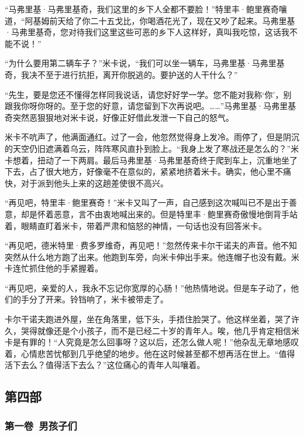 \par “马弗里基·马弗里基奇，我们这里的乡下人全都不要脸！”特里丰·鲍里赛奇嚷道，“阿基姆前天给了你二十五戈比，你喝酒花光了，现在又吵了起来。马弗里基·马弗里基奇，您对待我们这里这些可恶的乡下人这样好，真叫我吃惊，这话我不能不说！”
\par “为什么要用第二辆车子？”米卡说，“我们可以坐一辆车，马弗里基·马弗里基奇，我决不至于进行抗拒，离开你脱逃的。要护送的人干什么？”
\par “先生，要是您还不懂得怎样同我说话，请您好好学一学。您不能对我称‘你’，别跟我你呀你呀的。至于您的好意，请您留到下次再说吧。……”马弗里基·马弗里基奇突然恶狠狠地对米卡说，好像正好借此发泄一下自己的怒气。
\par 米卡不吭声了，他满面通红。过了一会，他忽然觉得身上发冷。雨停了，但是阴沉的天空仍旧遮满着乌云，阵阵寒风直扑到脸上。“我身上发了寒战还是怎么的？”米卡想着，扭动了一下两肩。最后马弗里基·马弗里基奇终于爬到车上，沉重地坐了下去，占了很大地方，好像毫不在意似的，紧紧地挤着米卡。确实，他心里不痛快，对于派到他头上来的这趟差使很不高兴。
\par “再见吧，特里丰·鲍里赛奇！”米卡又叫了一声，自己感到这次喊叫已不是出于善意，却是怀着恶意，言不由衷地喊出来的。但是特里丰·鲍里赛奇傲慢地倒背手站着，眼睛直盯着米卡，带着严肃和恼怒的神情，一句话也没有回答米卡。
\par “再见吧，德米特里·费多罗维奇，再见吧！”忽然传来卡尔干诺夫的声音。他不知突然从什么地方跑了出来。他跑到车旁，向米卡伸出手来。他连帽子也没有戴。米卡连忙抓住他的手紧握着。
\par “再见吧，亲爱的人，我永不忘记你宽厚的心肠！”他热情地说。但是车子动了，他们的手分了开来。铃铛响了，米卡被带走了。
\par 卡尔干诺夫跑进外屋，坐在角落里，低下头，手捂住脸哭了。他这样坐着，哭了许久，哭得就像还是个小孩子，而不是已经二十岁的青年人。唉，他几乎肯定相信米卡是有罪的！“人究竟是怎么回事呀？这以后，还怎么做人呢！”他杂乱无章地感叹着，心情悲苦忧郁到几乎绝望的地步。他在这时候甚至都不想再活在世上。“值得活下去么？值得活下去么？”这位痛心的青年人叫嚷着。







\subsection*{第四部}




\subsubsection*{第一卷\ 男孩子们}

